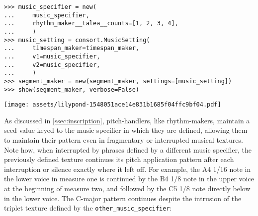 \begin{abjadbookoutput}
\begin{singlespacing}
\vspace{-0.5\baselineskip}
\begin{lstlisting}
>>> music_specifier = new(
...     music_specifier,
...     rhythm_maker__talea__counts=[1, 2, 3, 4],
...     )
>>> music_setting = consort.MusicSetting(
...     timespan_maker=timespan_maker,
...     v1=music_specifier,
...     v2=music_specifier,
...     )
>>> segment_maker = new(segment_maker, settings=[music_setting])
>>> show(segment_maker, verbose=False)
\end{lstlisting}
\noindent\texttt{[image: assets/lilypond-1548051ace14e831b1685f04ffc9bf04.pdf]}
\end{singlespacing}
\end{abjadbookoutput}

\noindent As discussed in \autoref{ssec:inscription}, pitch-handlers, like
rhythm-makers, maintain a seed value keyed to the music specifier in which they
are defined, allowing them to maintain their pattern even in fragmentary or
interrupted musical textures. Note how, when interrupted by phrases defined by
a different music specifier, the previously defined texture continues its pitch
application pattern after each interruption or silence exactly where it left
off. For example, the A4 1/16 note in the lower voice in measure one is
continued by the B4 1/8 note in the upper voice at the beginning of measure
two, and followed by the C5 1/8 note directly below in the lower voice. The
C-major pattern continues despite the intrusion of the triplet texture defined
by the \texttt{other\_music\_specifier}:


\begin{comment}
<abjad>[stylesheet=../consort.ily]
other_music_specifier = consort.MusicSpecifier(
    pitch_handler=consort.AbsolutePitchHandler(pitch_specifier='g fs e f'),
    rhythm_maker=rhythmmakertools.EvenDivisionRhythmMaker(
        denominators=[8],
        extra_counts_per_division=(1,),
        ),
    )
other_music_setting = consort.MusicSetting(
    timespan_maker=consort.TaleaTimespanMaker(
        initial_silence_talea=rhythmmakertools.Talea([1], 2),
        silence_talea=rhythmmakertools.Talea([1], 2),
        ),
    v1=other_music_specifier,
    v2=other_music_specifier,
    )
segment_maker = new(
    segment_maker,
    settings=[music_setting, other_music_setting],
    )
show(segment_maker, verbose=False)
</abjad>
\end{comment}

